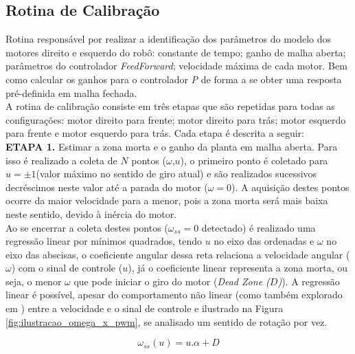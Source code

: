 \subsection{Rotina de Calibração}
\label{subsec:rotina_calibracao}

Rotina responsável por realizar a identificação dos parâmetros do modelo dos motores direito e esquerdo do robô: constante de tempo; ganho de malha aberta; parâmetros do controlador \emph{FeedForward}; velocidade máxima de cada motor. Bem como calcular os ganhos para o controlador \emph{P} de forma a se obter uma resposta pré-definida em malha fechada.\\

A rotina de calibração consiste em três etapas que são repetidas para todas as configurações: motor direito para frente; motor direito para trás; motor esquerdo para frente e motor esquerdo para trás. Cada etapa é descrita a seguir: \\


\textbf{ETAPA 1.} Estimar a zona morta e o ganho da planta em malha aberta. Para isso é realizado a coleta de $N$ pontos ($\omega$,$u$), o primeiro ponto é coletado para $u = \pm1$(valor máximo no sentido de giro atual) e são realizados sucessivos decréscimos neste valor até a parada do motor ($\omega = 0$). A aquisição destes pontos ocorre da maior velocidade para a menor, pois a zona morta será mais baixa neste sentido, devido à inércia do motor.\\

Ao se encerrar a coleta destes pontos ($\omega_{ss} = 0$ detectado) é realizado uma regressão linear por mínimos quadrados, tendo $u$ no eixo das ordenadas e $\omega$ no eixo das abscisas, o coeficiente angular dessa reta relaciona a velocidade angular ($\omega$) com o sinal de controle ($u$), já o coeficiente linear representa a zona morta, ou seja, o menor $\omega$ que pode iniciar o giro do motor (\emph{Dead Zone ($D$)}). A regressão linear é possível, apesar do comportamento não linear (como também explorado em \cite{dead_zone}) entre a velocidade e o sinal de controle e ilustrado na Figura \ref{fig:ilustracao_omega_x_pwm}, se analisado um sentido de rotação por vez.

\begin{equation}
    \omega_{ss}(u) = u.\alpha + D
    \label{eq:omega_x_sinal_de_controle}
\end{equation}

